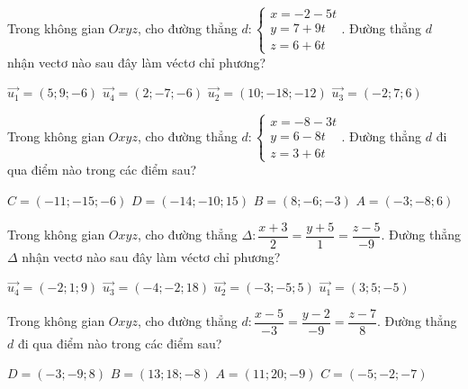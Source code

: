 \documentclass[12pt,a4paper]{article}
\begin{document}
\begin{ex}
 Trong không gian ${Oxyz}$, cho đường thẳng ${d}:\left\{ \begin{array}{l}x = -2-5t\\ y = 7+9t\\z = 6+6t\end{array} \right.$. Đường thẳng ${d}$ nhận vectơ nào sau đây làm véctơ chỉ phương?
 
\choice
{ $\overrightarrow{u_1}=(5;9;-6)$ }
   { $\overrightarrow{u_4}=(2;-7;-6)$ }
     { \True $\overrightarrow{u_2}=(10;-18;-12)$ }
    { $\overrightarrow{u_3}=(-2;7;6)$ }
\end{ex}

\begin{ex}
 Trong không gian ${Oxyz}$, cho đường thẳng ${d}:\left\{ \begin{array}{l}x = -8-3t\\ y = 6-8t\\z = 3+6t\end{array} \right.$. Đường thẳng ${d}$ đi qua điểm nào trong các điểm sau?
 
\choice
{ $C=(-11;-15;-6)$ }
   { \True $D=(-14;-10;15)$ }
     { $B=(8;-6;-3)$ }
    { $A=(-3;-8;6)$ }
\end{ex}

\begin{ex}
 Trong không gian ${Oxyz}$, cho đường thẳng ${\Delta}:\dfrac{x + 3}{2}=\dfrac{y + 5}{1}=\dfrac{z - 5}{-9}$. Đường thẳng ${\Delta}$ nhận vectơ nào sau đây làm véctơ chỉ phương?
 
\choice
{ $\overrightarrow{u_4}=(-2;1;9)$ }
   { \True $\overrightarrow{u_3}=(-4;-2;18)$ }
     { $\overrightarrow{u_2}=(-3;-5;5)$ }
    { $\overrightarrow{u_1}=(3;5;-5)$ }
\end{ex}

\begin{ex}
 Trong không gian ${Oxyz}$, cho đường thẳng ${d}:\dfrac{x - 5}{-3}=\dfrac{y - 2}{-9}=\dfrac{z - 7}{8}$. Đường thẳng ${d}$ đi qua điểm nào trong các điểm sau?
 
\choice
{ $D=(-3;-9;8)$ }
   { $B=(13;18;-8)$ }
     { \True $A=(11;20;-9)$ }
    { $C=(-5;-2;-7)$ }
\end{ex}
\end{document}
